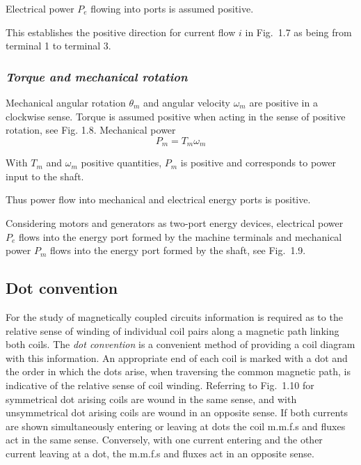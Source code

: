 \documentclass[a4paper,numbers=noenddot,12pt]{scrbook}
\begin{document}
Electrical power $P_e$ flowing into ports is assumed positive.

This establishes the positive direction for current flow $i$ in Fig.\ 1.7 as being from terminal 1 to terminal 3.

\subsubsection{\textit{Torque and mechanical rotation}} Mechanical angular rotation $\theta_m$ and angular velocity $\omega_m$ are positive in a clockwise sense. Torque is assumed positive when acting in the sense of positive rotation, see Fig. 1.8.
Mechanical power
\begin{equation*}
    P_m = T_m \omega_m
\end{equation*}

With $T_m$ and $\omega_m$ positive quantities, $P_m$ is positive and corresponds to power input to the shaft.

Thus power flow into mechanical and electrical energy ports is positive.

Considering motors and generators as two-port energy devices, electrical power $P_e$ flows into the energy port formed by the machine terminals and mechanical power $P_m$ flows into the energy port formed by the shaft, see Fig.\ 1.9.

\subsection{Dot convention}
For the study of magnetically coupled circuits information is required as to the relative sense of winding of individual coil pairs along a magnetic path linking both coils. The \textit{dot convention} is a convenient method of providing a coil diagram with this information. An appropriate end of each coil is marked with a dot and the order in which the dots arise, when traversing the common magnetic path, is indicative of the relative sense of coil winding. Referring to Fig.\ 1.10 for symmetrical dot arising
coils are wound in the same sense, and with unsymmetrical dot arising
coils are wound in an opposite sense. If both currents are shown simultaneously entering or leaving at dots the coil m.m.f.s and fluxes act in the same sense. Conversely, with one current entering and the other current leaving at a dot, the m.m.f.s and fluxes act in an opposite sense.
\end{document}
